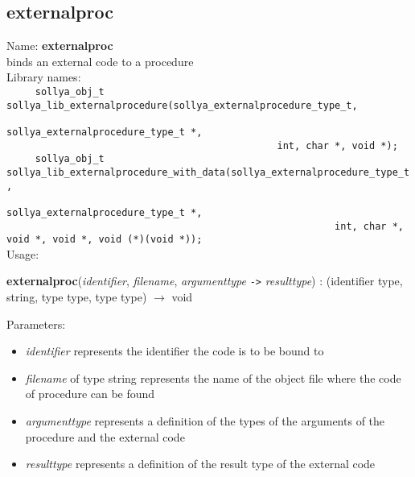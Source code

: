 \subsection{externalproc}
\label{labexternalproc}
\noindent Name: \textbf{externalproc}\\
\phantom{aaa}binds an external code to a \sollya procedure\\[0.2cm]
\noindent Library names:\\
\verb|     sollya_obj_t sollya_lib_externalprocedure(sollya_externalprocedure_type_t, |\\
\verb|                                               sollya_externalprocedure_type_t *,|\\
\verb|                                               int, char *, void *);|\\
\verb|     sollya_obj_t sollya_lib_externalprocedure_with_data(sollya_externalprocedure_type_t, |\\
\verb|                                                         sollya_externalprocedure_type_t *,|\\
\verb|                                                         int, char *, void *, void *, void (*)(void *));|\\[0.2cm]
\noindent Usage: 
\begin{center}
\textbf{externalproc}(\emph{identifier}, \emph{filename}, \emph{argumenttype} \texttt{->} \emph{resulttype}) : (\textsf{identifier type}, \textsf{string}, \textsf{type type}, \textsf{type type}) $\rightarrow$ \textsf{void}\\
\end{center}
Parameters: 
\begin{itemize}
\item \emph{identifier} represents the identifier the code is to be bound to
\item \emph{filename} of type \textsf{string} represents the name of the object file where the code of procedure can be found
\item \emph{argumenttype} represents a definition of the types of the arguments of the \sollya procedure and the external code
\item \emph{resulttype} represents a definition of the result type of the external code
\end{itemize}
